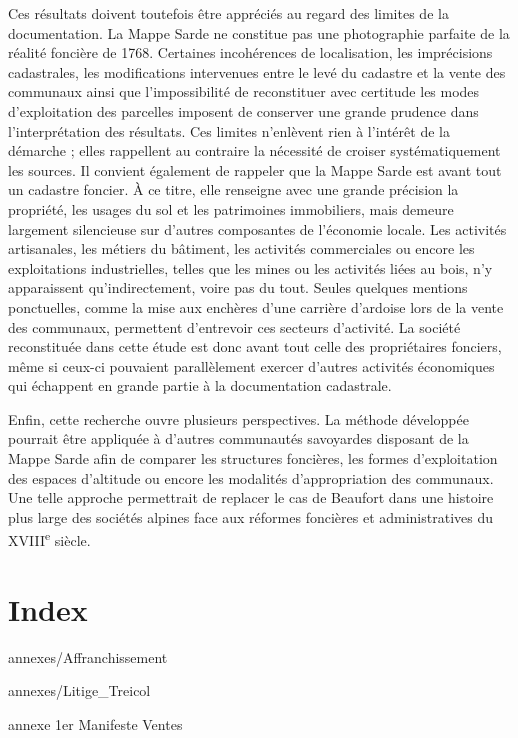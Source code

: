 \documentclass[12pt,a4paper]{report}
\begin{document}
Ces résultats doivent toutefois être appréciés au regard des limites de la documentation. La Mappe Sarde ne constitue pas une photographie parfaite de la réalité foncière de 1768. Certaines incohérences de localisation, les imprécisions cadastrales, les modifications intervenues entre le levé du cadastre et la vente des communaux ainsi que l'impossibilité de reconstituer avec certitude les modes d'exploitation des parcelles imposent de conserver une grande prudence dans l'interprétation des résultats. Ces limites n'enlèvent rien à l'intérêt de la démarche ; elles rappellent au contraire la nécessité de croiser systématiquement les sources.
Il convient également de rappeler que la Mappe Sarde est avant tout un cadastre foncier. À ce titre, elle renseigne avec une grande précision la propriété, les usages du sol et les patrimoines immobiliers, mais demeure largement silencieuse sur d'autres composantes de l'économie locale. Les activités artisanales, les métiers du bâtiment, les activités commerciales ou encore les exploitations industrielles, telles que les mines ou les activités liées au bois, n'y apparaissent qu'indirectement, voire pas du tout. Seules quelques mentions ponctuelles, comme la mise aux enchères d'une carrière d'ardoise lors de la vente des communaux, permettent d'entrevoir ces secteurs d'activité. La société reconstituée dans cette étude est donc avant tout celle des propriétaires fonciers, même si ceux-ci pouvaient parallèlement exercer d'autres activités économiques qui échappent en grande partie à la documentation cadastrale.

Enfin, cette recherche ouvre plusieurs perspectives. La méthode développée pourrait être appliquée à d'autres communautés savoyardes disposant de la Mappe Sarde afin de comparer les structures foncières, les formes d'exploitation des espaces d'altitude ou encore les modalités d'appropriation des communaux. Une telle approche permettrait de replacer le cas de Beaufort dans une histoire plus large des sociétés alpines face aux réformes foncières et administratives du XVIII\textsuperscript{e} siècle.
	
	
	
	
	\chapter{Index}
	
	\printindex[tab]
	\printindex[carte]
	\nocite{*}
	\printbibliography

	\appendix
	annexes/Affranchissement
	
	annexes/Litige_Treicol
	
	annexe 1er Manifeste Ventes
	
\end{document}
